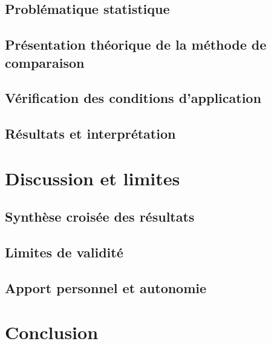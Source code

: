 \documentclass[11pt,a4paper]{report}
\begin{document}
\section{Problématique statistique}

\section{Présentation théorique de la méthode de comparaison}

\section{Vérification des conditions d'application}

\section{Résultats et interprétation}


\chapter{Discussion et limites}

\section{Synthèse croisée des résultats}

\section{Limites de validité}

\section{Apport personnel et autonomie}


\chapter*{Conclusion}




\end{document}

